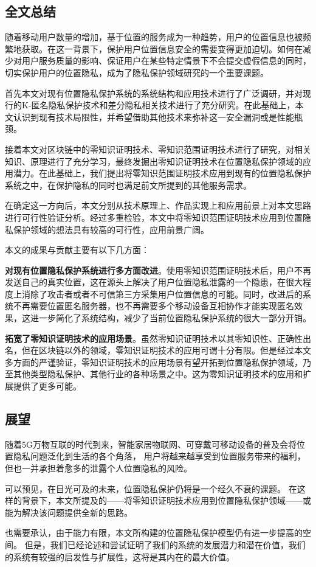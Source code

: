 \documentclass[zihao=-4]{ctexart}
\begin{document}
\subsection{全文总结}
随着移动用户数量的增加，基于位置的服务成为一种趋势，用户的位置信息也被频繁地获取。在这一背景下，保护用户位置信息安全的需要变得更加迫切。如何在减少对用户服务质量的影响、保证用户在某些特定情景下不会提交虚假信息的同时，切实保护用户的位置隐私，成为了隐私保护领域研究的一个重要课题。
\par 
首先本文对现有位置隐私保护系统的系统结构和应用技术进行了广泛调研，并对现行的K-匿名隐私保护技术和差分隐私相关技术进行了充分研究。在此基础上，本文认识到现有技术局限性，并希望借助其他技术来弥补这一安全漏洞或是性能瓶颈。
\par 
接着本文对区块链中的零知识证明技术、零知识范围证明技术进行了研究，对相关知识、原理进行了充分学习，最终发掘出零知识证明技术在位置隐私保护领域的应用潜力。在此基础上，我们提出将零知识范围证明技术应用到现有的位置隐私保护系统之中，在保护隐私的同时也满足前文所提到的其他服务需求。
\par 
在确定这一方向后，本文分别从技术原理上、作品实现上和应用前景上对本文思路进行可行性验证分析。经过多重检验，本文中将零知识范围证明技术应用到位置隐私保护领域的想法具有较高的可行性，应用前景广阔。
\par 
本文的成果与贡献主要有以下几方面：
\par 
\textbf{对现有位置隐私保护系统进行多方面改进}。使用零知识范围证明技术后，用户不再发送自己的真实位置，这在源头上解决了用户位置隐私泄露的一个隐患，在很大程度上消除了攻击者或者不可信第三方采集用户位置信息的可能。同时，改进后的系统不再需要位置匿名服务器，也不再需要多个移动设备互相协作才能实现匿名效果，这进一步简化了系统结构，减少了当前位置隐私保护系统的很大一部分开销。
\par 
\textbf{拓宽了零知识证明技术的应用场景}。虽然零知识证明技术以其零知识性、正确性出名，但在区块链以外的领域，零知识证明技术的应用可谓十分有限。但是经过本文多方面的严谨验证，零知识证明技术的应用场景有望开拓到位置隐私保护领域，乃至其他类型隐私保护、其他行业的各种场景之中。这为零知识证明技术的应用和扩展提供了更多可能。

\subsection{展望}
随着5G万物互联的时代到来，智能家居物联网、可穿戴可移动设备的普及会将位置隐私问题泛化到生活的各个角落，
用户将越来越享受到位置服务带来的福利，但也一并承担着愈多的泄露个人位置隐私的风险。

可以预见，在目光可及的未来，位置隐私保护仍将是一个经久不衰的课题。
在这样的背景下，本文所提及的——将零知识证明技术应用到位置隐私保护领域——或能为解决该问题提供全新的思路。
\par 
也需要承认，由于能力有限，本文所构建的位置隐私保护模型仍有进一步提高的空间。
但是，我们已经论述和尝试证明了我们的系统的发展潜力和潜在价值，我们的系统有较强的启发性与扩展性，这将是其内在的最大价值。
\end{document}
